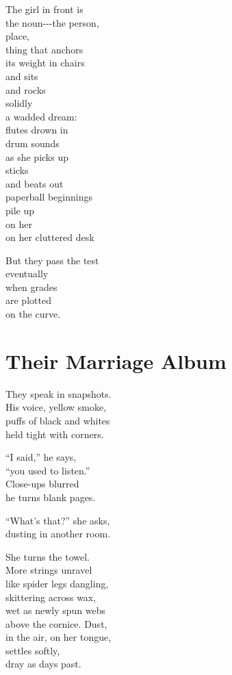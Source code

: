 \documentclass[twoside,10pt]{book}
\begin{document}
The girl in front is\\
the noun-\/-\/-the person,\\
place,\\
thing that anchors\\
its weight in chairs\\
and sits\\
and rocks\\
solidly\\
a wadded dream:\\
flutes drown in\\
drum sounds\\
as she picks up\\
sticks\\
and beats out\\
paperball beginnings\\
pile up\\
on her\\
on her cluttered desk

But they pass the test\\
eventually\\
when grades\\
are plotted\\
on the curve.


\clearpage
\section{Their Marriage Album}

They speak in snapshots.\\
His voice, yellow smoke,\\
puffs of black and whites\\
held tight with corners.

``I said,'' he says,\\
``you used to listen.''\\
Close-ups blurred\\
he turns blank pages.

``What's that?'' she asks,\\
dusting in another room.

She turns the towel.\\
More strings unravel\\
like spider legs dangling,\\
skittering across wax,\\
wet as newly spun webs\\
above the cornice. Dust,\\
in the air, on her tongue,\\
settles softly,\\
dray as days past.
\end{document}
